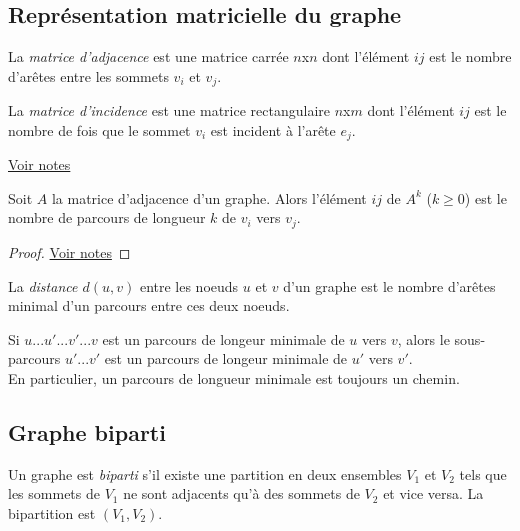 \subsection{Représentation matricielle du graphe}
\begin{mydef}
  La \emph{matrice d'adjacence} est une matrice carrée $n$x$n$ dont l'élément $ij$ est le nombre d'arêtes entre les sommets $v_i$ et $v_j$.
\end{mydef}

\begin{mydef}
  La \emph{matrice d'incidence} est une matrice rectangulaire $n$x$m$ dont l'élément $ij$ est le nombre de fois que le sommet $v_i$ est incident à l'arête $e_j$.
\end{mydef}

\begin{myexem}
  \href{https://dl.dropboxusercontent.com/u/44092863/Graph_Theory_Romain_Capron.pdf}{Voir notes} \addTODO
\end{myexem}

\begin{mytheo} 
  Soit $A$ la matrice d'adjacence d'un graphe. Alors l'élément $ij$ de $A^k$ ($k \geq 0$) est le nombre de parcours de longueur $k$ de $v_i$ vers $v_j$.
  \begin{proof}
     \href{https://dl.dropboxusercontent.com/u/44092863/Graph_Theory_Romain_Capron.pdf}{Voir notes} \addTODO
  \end{proof}
\end{mytheo}

\begin{mydef}
  La \emph{distance $d(u, v)$} entre les noeuds $u$ et $v$ d'un graphe est le nombre d'arêtes minimal d'un parcours entre ces deux noeuds.
\end{mydef}

\begin{mylem}
  Si $u...u'...v'...v$ est un parcours de longeur minimale de $u$ vers $v$, alors le sous-parcours $u'...v'$ est un parcours de longeur minimale de $u'$ vers $v'$.\\
  En particulier, un parcours de longueur minimale est toujours un chemin.
\end{mylem}

\subsection{Graphe biparti}
\begin{mydef}
  Un graphe est \emph{biparti}  s'il existe une partition en deux ensembles $V_1$ et $V_2$ tels que les sommets de $V_1$ ne sont adjacents qu'à des sommets de $V_2$ et vice versa. La bipartition est $(V_1, V_2)$.
\end{mydef}

